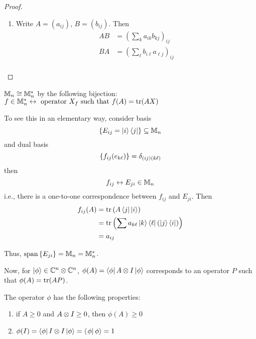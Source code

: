 \begin{proof}\mbox{}
    \begin{enumerate}[label=\arabic*)]
        \item Write $A = (a_{ij})$, $B = (b_{ij})$. Then
              \begin{align*}
                  AB & = \left(\sum_k a_{ik}b_{kj}\right)_{ij}             \\
                  BA & = \left(\sum_{\ell} b_{i\ell}a_{\ell j}\right)_{ij} \\
              \end{align*}
    \end{enumerate}
\end{proof}

\begin{lemma}
    $\mathbb{M}_n \cong \mathbb{M}_n^*$ by the following bijection:
    $f\in\mathbb{M}_n^* \leftrightarrow \hbox{ operator $X_f$ such that $f(A) = \operatorname{tr}(AX)$}$
\end{lemma}

To see this in an elementary way, consider basis
\[\left\lbrace E_{ij} = \left|i\right\rangle\left\langle j\right|\right\rbrace\subseteq \mathbb{M}_n\]
and dual basis
\[\left\lbrace f_{ij}(e_{k\ell})\right\rbrace = \delta_{(ij)(k\ell)}\]
then
\[f_{ij} \leftrightarrow E_{ji}\in\mathbb{M}_n\]
i.e., there is a one-to-one correspondence between $f_{ij}$ and $E_{ji}$. Then
\begin{align*}f_{ij}(A)
     & = \operatorname{tr}\left(A\left\langle j\right|\left|i\right\rangle\right)                                            \\
     & = \operatorname{tr}\left(\sum a_{k\ell}\left|k\right\rangle\left\langle \ell\right|\left(\left|j\right\rangle\left\langle i\right|\right)\right) \\
     & = a_{ij}
\end{align*}

Thus, $\operatorname{span}\left\lbrace E_{ji}\right\rbrace = \mathbb{M}_n = \mathbb{M}_n^*$.

Now, for $\left|\phi\right\rangle \in \mathbb{C}^n\otimes\mathbb{C}^n$,
$\phi(A) = \left\langle \phi\right|A\otimes I\left|\phi\right\rangle$ corresponds to an operator $P$ such that
$\phi(A) = \operatorname{tr}(AP)$.

The operator $\phi$ has the following properties:
\begin{enumerate}[label=\arabic*)]
    \item\label{item:linpos} if $A \geq 0$ and $A \otimes I \geq 0$, then $\phi(A) \geq 0$
    \item\label{item:linidis1} $\phi(I) = \left\langle \phi\right|I\otimes I\left|\phi\right\rangle = \left\langle \left.\phi\right|\phi\right\rangle=1$
\end{enumerate}

